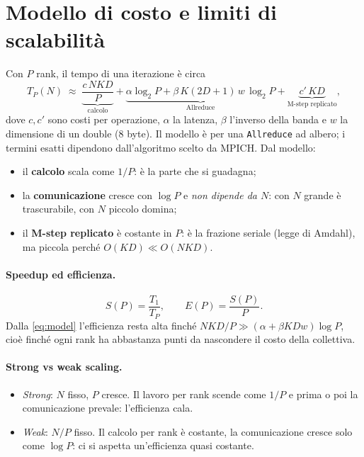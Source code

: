 \documentclass[11pt,a4paper]{article}
\theoremstyle{definition}
\begin{document}
\section{Modello di costo e limiti di scalabilità}
Con $P$ rank, il tempo di una iterazione è circa
\begin{equation}
T_P(N)\;\approx\;\underbrace{\frac{c\,NKD}{P}}_{\text{calcolo}}
+\underbrace{\alpha\log_2 P+\beta\,K(2D+1)\,w\,\log_2 P}_{\text{Allreduce}}
+\underbrace{c'\,KD}_{\text{M-step replicato}},
\label{eq:model}
\end{equation}
dove $c,c'$ sono costi per operazione, $\alpha$ la latenza, $\beta$ l'inverso
della banda e $w$ la dimensione di un double (8 byte). Il modello è per una
\texttt{Allreduce} ad albero; i termini esatti dipendono dall'algoritmo scelto da
MPICH. Dal modello:
\begin{itemize}
  \item il \textbf{calcolo} scala come $1/P$: è la parte che si guadagna;
  \item la \textbf{comunicazione} cresce con $\log P$ e \emph{non dipende da $N$}:
        con $N$ grande è trascurabile, con $N$ piccolo domina;
  \item il \textbf{M-step replicato} è costante in $P$: è la frazione seriale
        (legge di Amdahl), ma piccola perché $O(KD)\ll O(NKD)$.
\end{itemize}

\paragraph{Speedup ed efficienza.}
\begin{equation}
S(P)=\frac{T_1}{T_P},\qquad E(P)=\frac{S(P)}{P}.
\end{equation}
Dalla \eqref{eq:model} l'efficienza resta alta finché $NKD/P\gg
(\alpha+\beta K D w)\log P$, cioè finché ogni rank ha abbastanza punti da
nascondere il costo della collettiva.

\paragraph{Strong vs weak scaling.}
\begin{itemize}
  \item \emph{Strong}: $N$ fisso, $P$ cresce. Il lavoro per rank scende come $1/P$ e prima o poi la
        comunicazione prevale: l'efficienza cala.
  \item \emph{Weak}: $N/P$ fisso. Il calcolo per rank è costante, la comunicazione
        cresce solo come $\log P$: ci si aspetta un'efficienza quasi costante.
\end{itemize}
\end{document}

